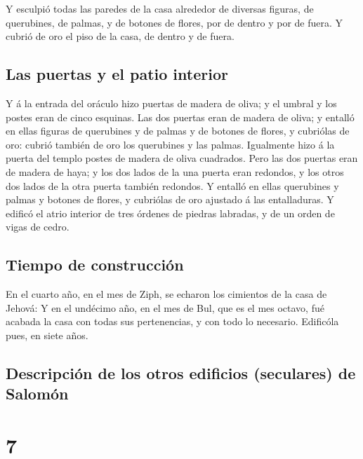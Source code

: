  Y esculpió todas las paredes de la casa alrededor de
diversas figuras, de querubines, de palmas, y de botones de flores, por
de dentro y por de fuera.  Y cubrió de oro el piso de la
casa, de dentro y de fuera.

\hypertarget{las-puertas-y-el-patio-interior}{%
\subsection{Las puertas y el patio
interior}\label{las-puertas-y-el-patio-interior}}

 Y á la entrada del oráculo hizo puertas de madera de
oliva; y el umbral y los postes eran de cinco esquinas. 
Las dos puertas eran de madera de oliva; y entalló en ellas figuras de
querubines y de palmas y de botones de flores, y cubriólas de oro:
cubrió también de oro los querubines y las palmas. 
Igualmente hizo á la puerta del templo postes de madera de oliva
cuadrados.  Pero las dos puertas eran de madera de haya;
y los dos lados de la una puerta eran redondos, y los otros dos lados de
la otra puerta también redondos.  Y entalló en ellas
querubines y palmas y botones de flores, y cubriólas de oro ajustado á
las entalladuras.  Y edificó el atrio interior de tres
órdenes de piedras labradas, y de un orden de vigas de cedro.

\hypertarget{tiempo-de-construcciuxf3n}{%
\subsection{Tiempo de construcción}\label{tiempo-de-construcciuxf3n}}

 En el cuarto año, en el mes de Ziph, se echaron los
cimientos de la casa de Jehová:  Y en el undécimo año, en
el mes de Bul, que es el mes octavo, fué acabada la casa con todas sus
pertenencias, y con todo lo necesario. Edificóla pues, en siete años.

\hypertarget{descripciuxf3n-de-los-otros-edificios-seculares-de-salomuxf3n}{%
\subsection{Descripción de los otros edificios (seculares) de
Salomón}\label{descripciuxf3n-de-los-otros-edificios-seculares-de-salomuxf3n}}

\hypertarget{section-6}{%
\section{7}\label{section-6}}

